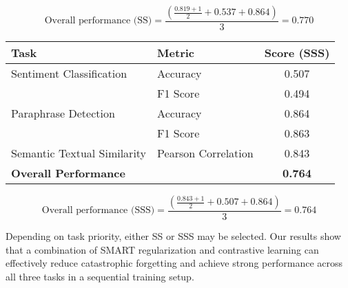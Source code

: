 \documentclass[12pt]{article}
\begin{document}
\[
\text{Overall performance (SS)} = \frac{\left( \frac{0.819 + 1}{2} + 0.537 + 0.864 \right)}{3} = 0.770
\]

\begin{table}[H]
\centering
\begin{tabular}{|l|l|c|}
\hline
\textbf{Task} & \textbf{Metric} & \textbf{Score (SSS)} \\
\hline
Sentiment Classification & Accuracy & 0.507 \\
                         & F1 Score & 0.494 \\
\hline
Paraphrase Detection     & Accuracy & 0.864 \\
                         & F1 Score & 0.863 \\
\hline
Semantic Textual Similarity & Pearson Correlation & 0.843 \\
\hline
\textbf{Overall Performance} &  & \textbf{0.764} \\
\hline
\end{tabular}
\end{table}

\[
\text{Overall performance (SSS)} = \frac{\left( \frac{0.843 + 1}{2} + 0.507 + 0.864 \right)}{3} = 0.764
\]

Depending on task priority, either SS or SSS may be selected. Our results show that a combination of SMART regularization and contrastive learning can effectively reduce catastrophic forgetting and achieve strong performance across all three tasks in a sequential training setup.
\end{document}
